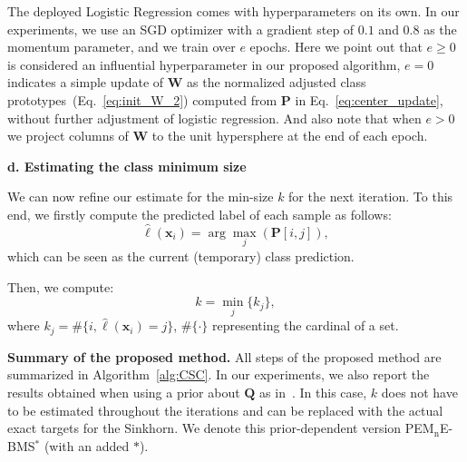 \documentclass[review]{elsarticle}
\begin{document}
The deployed Logistic Regression comes with hyperparameters on its own. In our experiments, we use an SGD optimizer with a gradient step of $0.1$ and $0.8$ as the momentum parameter, and we train over $e$ epochs. Here we point out that $e\geq 0$ is considered an influential hyperparameter in our proposed algorithm, $e=0$ indicates a simple update of $\mathbf{W}$ as the normalized adjusted class prototypes~(Eq.~\ref{eq:init_W_2}) computed from $\mathbf{P}$ in Eq.~\ref{eq:center_update}, without further adjustment of logistic regression. And also note that when $e>0$ we project columns of $\mathbf{W}$ to the unit hypersphere at the end of each epoch. 

\textbf{d. Estimating the class minimum size}

We can now refine our estimate for the min-size $k$ for the next iteration. To this end, we firstly compute the predicted label of each sample as follows: 
\begin{equation}
\hat{\ell}(\mathbf{x}_i)=\arg\max_j(\mathbf{P}[i,j]),
\label{eq:predictions}
\end{equation} 
which can be seen as the current (temporary) class prediction.

Then, we compute:
\begin{equation}
k = \min_{j}{\{k_j\}},
\label{eq:k}
\end{equation} 
where $k_j = \#\{i, \hat{\ell}(\mathbf{x}_i) = j\}$, $\#\{\cdot\}$ representing the cardinal of a set.

\textbf{Summary of the proposed method.} All steps of the proposed method are summarized in Algorithm~\ref{alg:CSC}. In our experiments, we also report the results obtained when using a prior about $\mathbf{Q}$ as in~\cite{hu2021leveraging}. In this case, $k$ does not have to be estimated throughout the iterations and can be replaced with the actual exact targets for the Sinkhorn. We denote this prior-dependent version PE$\mathrm{M_n}$E-BMS$^*$ (with an added $*$).
\end{document}
